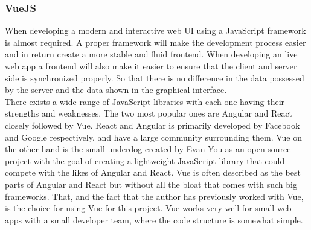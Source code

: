 \documentclass{article}
\begin{document}
\subsubsection{VueJS}
When developing a modern and interactive web UI using a JavaScript framework is almost required. A proper framework will make the development process easier and in return create a more stable and fluid frontend. When developing an live web app a frontend will also make it easier to ensure that the client and server side is synchronized properly. So that there is no difference in the data possessed by the server and the data shown in the graphical interface.
\\
There exists a wide range of JavaScript libraries with each one having their strengths and weaknesses. The two most popular ones are Angular and React closely followed by Vue\cite{url:implementation:javascript-frameworks}. React and Angular is primarily developed by Facebook and Google respectively, and have a large community surrounding them. Vue on the other hand is the small underdog created by Evan You as an open-source project with the goal of creating a lightweight JavaScript library that could compete with the likes of Angular and React. Vue is often described as the best parts of Angular and React but without all the bloat that comes with such big frameworks. That, and the fact that the author has previously worked with Vue, is the choice for using Vue for this project. Vue works very well for small web-apps with a small developer team, where the code structure is somewhat simple.

\end{document}
